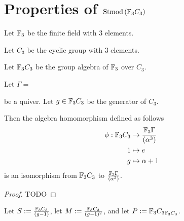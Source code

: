 \section{Properties of \texorpdfstring{\( \operatorname{Stmod}\left(  {\mathbb{F}}_3 C_3  \right) \)}{Stmod(F\_3C\_3)}} %


\begin{notation}
    Let \( {\mathbb{F}}_3 \) be the finite field with \( 3 \) elements.
\end{notation}

\begin{notation}
    Let \( C_3 \) be the cyclic group with \( 3 \) elements.
\end{notation}

\begin{notation}
    Let \( {\mathbb{F}}_3 C_3 \) be the group algebra of \( {\mathbb{F}}_3 \) over \( C_3 \).
\end{notation}

\begin{lemma}
    Let \( \Gamma = \)
    be a quiver.
    Let \( g \in {\mathbb{F}}_3 C_3 \) be the generator of \( C_3 \).
    
    Then the algebra homomorphism defined as follows
    \begin{align*}
        \phi: {\mathbb{F}}_3 C_3 &\to \frac{{\mathbb{F}}_3\Gamma}{(\alpha^3)} \\
        1 &\mapsto e \\
        g &\mapsto \alpha + 1
    \end{align*}
    is an isomorphism from \( {\mathbb{F}}_3 C_3 \) to \( \frac{{\mathbb{F}}_3\Gamma}{(\alpha^3)} \).    
\end{lemma}
\begin{proof}
    TODO
\end{proof}

\begin{definition}
    Let \( S := \frac{{\mathbb{F}}_3C_3}{(g - 1)} \), let \( M := \frac{{\mathbb{F}}_3C_3}{(g - 1)^2} \), and let \( P := {{\mathbb{F}}_3C_3}_{{\mathbb{F}}_3C_3} \).
\end{definition}

